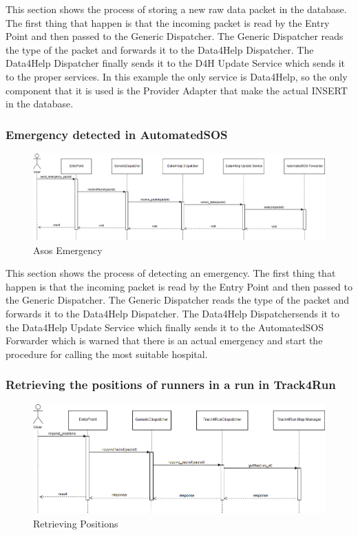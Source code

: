 This section shows the process of storing a new raw data packet in the database. The first thing that happen is that the incoming packet is read by the Entry Point and then passed to the Generic Dispatcher. The Generic Dispatcher reads the type of the packet and forwards it to the Data4Help Dispatcher. The Data4Help Dispatcher finally sends it to the D4H Update Service which sends it to the proper services. In this example the only service is Data4Help, so the only component that it is used is the Provider Adapter that make the actual INSERT in the database.
{\color{secblue}\subsubsection{Emergency detected in AutomatedSOS}}
\begin{figure}[H]
    \includegraphics[width=\linewidth, keepaspectratio]{./Images/asos_emergency.png}
    \centering
    \caption{Asos Emergency}
    \label{fig:depview}
  \end{figure}
This section shows the process of detecting an emergency. The first thing that happen is that the incoming packet is read by the Entry Point and then passed to the Generic Dispatcher. The Generic Dispatcher reads the type of the packet and forwards it to the Data4Help Dispatcher. The Data4Help Dispatchersends it to the Data4Help Update Service which finally sends it to the AutomatedSOS Forwarder which is warned that there is an actual emergency and start the procedure for calling the most suitable hospital.
{\color{secblue}\subsubsection{Retrieving the positions of runners in a run in Track4Run}}
\begin{figure}[H]
    \includegraphics[width=\linewidth, keepaspectratio]{./Images/retrieving_positions.png}
    \centering
    \caption{Retrieving Positions}
    \label{fig:depview}
  \end{figure}
